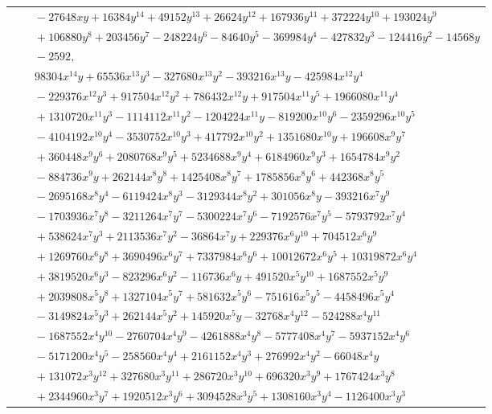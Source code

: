 \documentclass[11pt]{article}
\begin{document}
\begin{longtable}{@{}ll@{}}
 & $\quad -27648xy+16384y^{14}+49152y^{13}+26624y^{12}+167936y^{11}+372224y^{10}+193024y^{9}$\\
 & $\quad +106880y^{8}+203456y^{7}-248224y^{6}-84640y^{5}-369984y^{4}-427832y^{3}-124416y^{2}-14568y$\\
 & $\quad -2592,$\\
 & $\quad 98304x^{14}y+65536x^{13}y^{3}-327680x^{13}y^{2}-393216x^{13}y-425984x^{12}y^{4}$\\
 & $\quad -229376x^{12}y^{3}+917504x^{12}y^{2}+786432x^{12}y+917504x^{11}y^{5}+1966080x^{11}y^{4}$\\
 & $\quad +1310720x^{11}y^{3}-1114112x^{11}y^{2}-1204224x^{11}y-819200x^{10}y^{6}-2359296x^{10}y^{5}$\\
 & $\quad -4104192x^{10}y^{4}-3530752x^{10}y^{3}+417792x^{10}y^{2}+1351680x^{10}y+196608x^{9}y^{7}$\\
 & $\quad +360448x^{9}y^{6}+2080768x^{9}y^{5}+5234688x^{9}y^{4}+6184960x^{9}y^{3}+1654784x^{9}y^{2}$\\
 & $\quad -884736x^{9}y+262144x^{8}y^{8}+1425408x^{8}y^{7}+1785856x^{8}y^{6}+442368x^{8}y^{5}$\\
 & $\quad -2695168x^{8}y^{4}-6119424x^{8}y^{3}-3129344x^{8}y^{2}+301056x^{8}y-393216x^{7}y^{9}$\\
 & $\quad -1703936x^{7}y^{8}-3211264x^{7}y^{7}-5300224x^{7}y^{6}-7192576x^{7}y^{5}-5793792x^{7}y^{4}$\\
 & $\quad +538624x^{7}y^{3}+2113536x^{7}y^{2}-36864x^{7}y+229376x^{6}y^{10}+704512x^{6}y^{9}$\\
 & $\quad +1269760x^{6}y^{8}+3690496x^{6}y^{7}+7337984x^{6}y^{6}+10012672x^{6}y^{5}+10319872x^{6}y^{4}$\\
 & $\quad +3819520x^{6}y^{3}-823296x^{6}y^{2}-116736x^{6}y+491520x^{5}y^{10}+1687552x^{5}y^{9}$\\
 & $\quad +2039808x^{5}y^{8}+1327104x^{5}y^{7}+581632x^{5}y^{6}-751616x^{5}y^{5}-4458496x^{5}y^{4}$\\
 & $\quad -3149824x^{5}y^{3}+262144x^{5}y^{2}+145920x^{5}y-32768x^{4}y^{12}-524288x^{4}y^{11}$\\
 & $\quad -1687552x^{4}y^{10}-2760704x^{4}y^{9}-4261888x^{4}y^{8}-5777408x^{4}y^{7}-5937152x^{4}y^{6}$\\
 & $\quad -5171200x^{4}y^{5}-258560x^{4}y^{4}+2161152x^{4}y^{3}+276992x^{4}y^{2}-66048x^{4}y$\\
 & $\quad +131072x^{3}y^{12}+327680x^{3}y^{11}+286720x^{3}y^{10}+696320x^{3}y^{9}+1767424x^{3}y^{8}$\\
 & $\quad +2344960x^{3}y^{7}+1920512x^{3}y^{6}+3094528x^{3}y^{5}+1308160x^{3}y^{4}-1126400x^{3}y^{3}$\\

\end{longtable}
\end{document}
